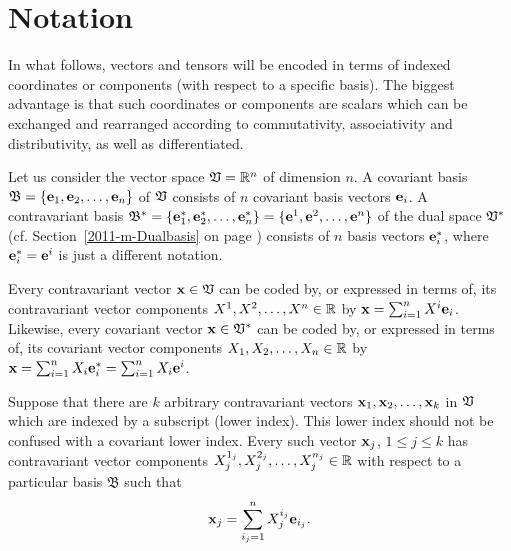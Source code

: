 \section{Notation}

In what follows, vectors and tensors will be encoded in terms of indexed coordinates or components
(with respect to a specific basis).
The biggest advantage is that such coordinates or components are scalars which can be
exchanged and rearranged according to commutativity, associativity and distributivity,
as well as differentiated.

Let us consider
the vector space ${\frak V} = {\Bbb R}^n$ of dimension $n$.
A covariant basis
${\mathfrak B}=\{{\bf e}_1,{\bf e}_2,\ldots ,{\bf e}_n\}$ of ${\frak V}$
consists of
$n$ covariant basis vectors ${\bf e}_i$.
A contravariant basis
${\mathfrak B}^\ast =\{{\bf e}_1^\ast,{\bf e}_2^\ast,\ldots ,{\bf e}_n^\ast\}
= \{{\bf e}^1,{\bf e}^2,\ldots ,{\bf e}^n\}$ of the dual space ${\frak V}^\ast$
(cf. Section~\ref{2011-m-Dualbasis} on page \pageref{2011-m-Dualbasis})
consists of
$n$ basis vectors ${\bf e}_i^\ast$, where ${\bf e}_i^\ast = {\bf e}^i$ is just a different notation.

Every contravariant vector ${\bf x} \in {\frak V}$ can be coded by,  or expressed in terms of, its contravariant vector components
$X^1, X^2, \ldots , X^n \in {\Bbb R}$
by
${\bf x} =\sum_{i=1}^n X^{i} {\bf e}_{i}$.
Likewise, every covariant vector ${\bf x} \in {\frak V}^\ast$ can be coded by, or expressed in terms of, its covariant vector components
$X_1, X_2, \ldots , X_n \in {\Bbb R}$
by
${\bf x} =\sum_{i=1}^n X_{i} {\bf e}_{i}^\ast =\sum_{i=1}^n X_{i} {\bf e}^{i}$.

Suppose that there are $k$ arbitrary contravariant vectors ${\bf x}_1,{\bf x}_2,\ldots ,{\bf x}_k$ in ${\frak V}$ which are indexed by a subscript
(lower index). This lower index should not  be confused with a covariant lower index.
Every such vector ${\bf x}_j$, $1 \le j \le k$ has contravariant vector components
$X^{1_j}_j, X^{2_j}_j, \ldots , X^{n_j}_j \in {\Bbb R}$
with respect to a particular basis ${\mathfrak B}$
such that
\begin{equation}
{\bf x}_j =\sum_{{i_j}=1}^n X^{i_j}_j{\bf e}_{{i_j}}.
\label{2016-m-tensor-contrvvs}
\end{equation}


